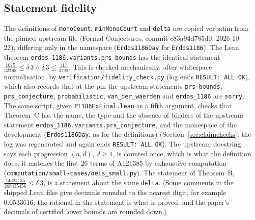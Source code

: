 \documentclass[11pt]{amsart}
\theoremstyle{remark}
\newcommand{\lean}[1]{\texttt{#1}}
\begin{document}
\subsection{Statement fidelity}
The definitions of \lean{monoCount}, \lean{minMonoCount} and \lean{delta} are copied verbatim from the pinned upstream file (Formal Conjectures, commit c83a94d785d0, 2026-10-22), differing only in the namespace
(\lean{Erdos1186Day} for \lean{Erdos1186}). The Lean theorem \lean{erdos\_1186.variants.prs\_bounds} has the identical statement $\tfrac{1675}{32768}\le\delta\,3\wedge\delta\,3\le\tfrac{117}{2192}$. This is checked mechanically, after whitespace normalisation, by
\texttt{verification/fidelity\_check.py} (log ends \texttt{RESULT: ALL OK}), which also records that at the pin the upstream statements \lean{prs\_bounds}, \lean{prs\_conjecture}, \lean{probabilistic}, \lean{van\_der\_waerden} and \lean{erdos\_1186} are \texttt{sorry}. The same script, given \texttt{P1186ExFinal.lean} as a fifth argument, checks that Theorem~C has the name, the type and the absence of binders of the upstream statement \lean{erdos\_1186.variants.prs\_conjecture}, and the namespace of the development (\lean{Erdos1186Day}, as for the definitions) (Section~\ref{sec:claimchecks}; the log was regenerated and again ends \texttt{RESULT: ALL OK}).
The upstream docstring says each progression $(a,d)$, $d\ge1$, is counted once, which is what the definition does; it matches the first $26$ terms of A121385 by exhaustive computation (\texttt{computation/small-cases/oeis\_small.py}).
The statement of Theorem~B, $\tfrac{14324135}{268435456}\le\delta\,3$, is a statement about the same \lean{delta}. (Some comments in the shipped Lean files give decimals rounded to the nearest digit, for example $0.0533616$; the rational in the statement is what is proved, and the paper's decimals of certified lower bounds are rounded down.)
\end{document}
